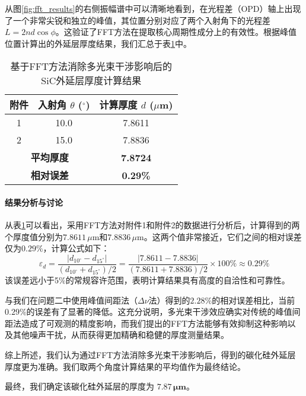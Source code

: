 \documentclass{ctexart} %
\begin{document}
从图\ref{fig:fft_results}的右侧振幅谱中可以清晰地看到，在光程差（OPD）轴上出现了一个非常尖锐和独立的峰值，其位置分别对应了两个入射角下的光程差$L = 2nd\cos\phi$。这验证了FFT方法在提取核心周期性成分上的有效性。根据峰值位置计算出的外延层厚度结果，我们汇总于表\ref{tab:fft_results}中。

\begin{table}[htbp]
    \centering
    \caption{基于FFT方法消除多光束干涉影响后的SiC外延层厚度计算结果}
    \label{tab:fft_results}
    \begin{tabular}{ccc}
        \toprule
        附件                                & 入射角 $\theta$ ($^\circ$) & 计算厚度 $d$ ($\mu$m) \\
        \midrule
        1                                 & 10.0                    & 7.8611            \\
        2                                 & 15.0                    & 7.8836            \\
        \midrule
        \multicolumn{2}{c}{\textbf{平均厚度}} & \textbf{7.8724}                             \\
        \multicolumn{2}{c}{\textbf{相对误差}} & \textbf{0.29\%}                             \\
        \bottomrule
    \end{tabular}
\end{table}

\paragraph{结果分析与讨论}
从表\ref{tab:fft_results}可以看出，采用FFT方法对附件1和附件2的数据进行分析后，计算得到的两个厚度值分别为$7.8611\,\mu\text{m}$和$7.8836\,\mu\text{m}$。这两个值非常接近，它们之间的相对误差仅为$0.29\%$，计算公式如下：
$$ \varepsilon_d = \frac{|d_{10^\circ} - d_{15^\circ}|}{(d_{10^\circ} + d_{15^\circ})/2} = \frac{|7.8611 - 7.8836|}{(7.8611 + 7.8836)/2} \times 100\% \approx 0.29\% $$
该误差远小于5\%的常规容许范围，表明计算结果具有高度的自洽性和可靠性。

与我们在问题二中使用峰值间距法（$\Delta\nu$法）得到的$2.28\%$的相对误差相比，当前$0.29\%$的误差有了显著的降低。这充分说明，多光束干涉效应确实对传统的峰值间距法造成了可观测的精度影响，而我们提出的FFT方法能够有效抑制这种影响以及其他噪声干扰，从而获得更加精确和稳健的厚度测量结果。

综上所述，我们认为通过FFT方法消除多光束干涉影响后，得到的碳化硅外延层厚度更为准确。我们取两个角度计算结果的平均值作为最终结论。

最终，我们确定该碳化硅外延层的厚度为 $\mathbf{7.87\,\mu m}$。
\end{document}
